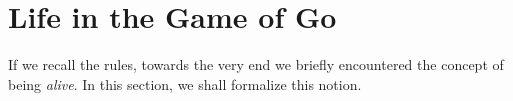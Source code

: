 %	
%	

\section{Life in the Game of Go}\label{sec-vida}

If we recall the rules, towards the very end we briefly encountered the concept of being \textit{alive}. In this section, we shall formalize this notion.

